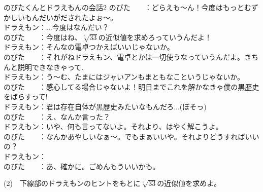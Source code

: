 \documentclass[a4j,dvipdfmx]{jsarticle}
\begin{document}
    \begin{itembox}[c]{のびたくんとドラえもんの会話2}
        のびた　　：どらえも～ん！今度はもっとむずかしいもんだいがだされたよぉ～。\\
        ドラえもン：...今度はなんだい？\\
        のびた　　：今度はね、$\sqrt[5]{33}$の近似値を求めろっていうんだよ！\\
        ドラえもン：そんなの電卓つかえばいいじゃないか。\\
        のびた　　：それがねドラえもン、電卓とかは一切使うなっていうんだよ。きちんと説明できなきゃって.\\
        ドラえもン：う～む、たまにはジャいアンもまともなこというじゃないか。\\
        のびた　　：感心してる場合じゃないよ！明日までこれを解かなきゃ僕の黒歴史をばらすって!\\
        ドラえもン：君は存在自体が黒歴史みたいなもんだろ...(ぼそっ)\\
        のびた　　：え、なんか言った？\\
        ドラえもン：いや、何も言ってないよ。それより、はやく解こうよ。\\
        のびた　　：なんかあやしいなぁ～。でもまぁいいや。それよりどうすればいいの？\\
        ドラえもン：\\
        のびた　　：あ、確かに。ごめんもういいかも。
    \end{itembox}
    (2)　下線部のドラえもンのヒントをもとに$\sqrt[5]{33}$の近似値を求めよ。
\end{document}
